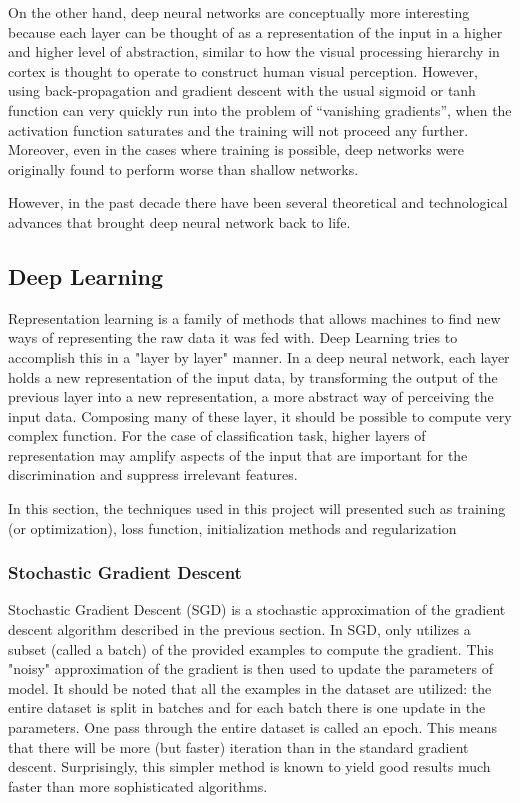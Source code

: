 On the other hand, deep neural networks are conceptually more interesting because each layer can be thought of as a representation of the input in a higher and higher level of abstraction, similar to how the visual processing hierarchy in cortex is thought to operate to construct human visual perception. However, using back-propagation and gradient descent with the usual sigmoid or tanh function can very quickly run into the problem of “vanishing gradients”, when the activation function saturates and the training will not proceed any further. Moreover, even in the cases where training is possible, deep networks were originally found to perform worse than shallow networks.

However, in the past decade there have been several theoretical and technological advances that brought deep neural network back to life.

\subsection{Deep Learning}
\label{subsec:Deep-Learning}
Representation learning is a family of methods that allows machines to find new ways of representing the raw data it was fed with. Deep Learning tries to accomplish this in a "layer by layer" manner. In a deep neural network, each layer holds a new representation of the input data, by transforming the output of the previous layer into a new representation, a more abstract way of perceiving the input data. Composing many of these layer, it should be possible to compute very complex function. For the case of classification task, higher layers of representation may amplify aspects of the input that are important for the discrimination and suppress irrelevant features.

In this section, the techniques used in this project will presented such as training (or optimization), loss function, initialization methods and regularization

\subsubsection{Stochastic Gradient Descent}
\label{subsubsec:SGD}
Stochastic Gradient Descent (SGD) is a stochastic approximation of the gradient descent algorithm described in the previous section. In SGD, only utilizes a subset (called a batch) of the provided examples to compute the gradient. This "noisy" approximation of the gradient is then used to update the parameters of model. It should be noted that all the examples in the dataset are utilized: the entire dataset is split in batches and for each batch there is one update in the parameters. One pass through the entire dataset is called an epoch. This means that there will be more (but faster) iteration than in the standard gradient descent. Surprisingly, this simpler method is known to yield good results much faster than more sophisticated algorithms.

